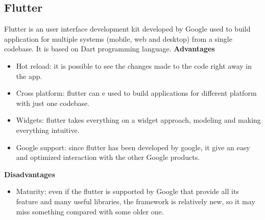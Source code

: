 \documentclass[../ITD.tex]{subfiles}
\begin{document}
    \subsection{Flutter}\label{subsec:flutter}
    Flutter is an user interface development kit developed by Google used to build application for multiple systems (mobile, web and desktop) from a single codebase.
    It is based on Dart programming language.
    \newline
    \textbf{Advantages}
    \begin{itemize}
        \item Hot reload: it is possible to see the changes made to the code right away in the app.
        \item Cross platform: flutter can e used to build applications for different platform with just one codebase.
        \item Widgets: flutter takes everything on a widget approach, modeling and making everything intuitive.
        \item Google support: since flutter has been developed by google, it give an easy and optimized interaction with the other Google products.
    \end{itemize}

    \textbf{Disadvantages}
    \begin{itemize}
        \item Maturity: even if the flutter is supported by Google that provide all its feature and many useful libraries, the framework is relatively new, so it may miss something compared with some older one.
    \end{itemize}
\end{document}
